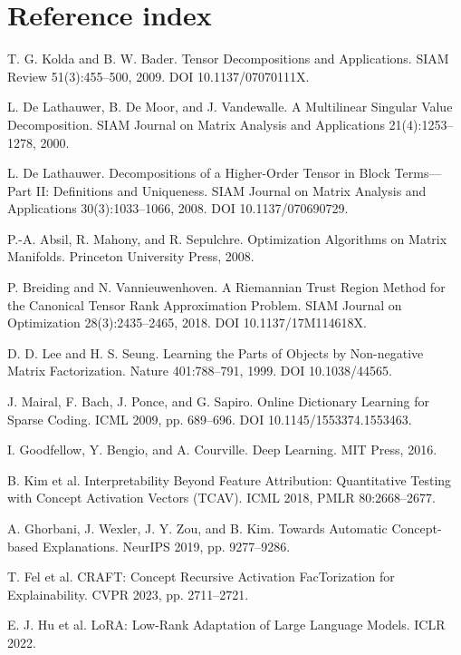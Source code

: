 \documentclass[10pt]{article}
\begin{document}
\section{Reference index}
\begin{description}[leftmargin=1.55cm,style=nextline,itemsep=.55em]
\item[\textbf{[KB09]}] T. G. Kolda and B. W. Bader. Tensor Decompositions and Applications. SIAM Review 51(3):455--500, 2009. DOI 10.1137/07070111X.
\item[\textbf{[DLV00]}] L. De Lathauwer, B. De Moor, and J. Vandewalle. A Multilinear Singular Value Decomposition. SIAM Journal on Matrix Analysis and Applications 21(4):1253--1278, 2000.
\item[\textbf{[DL08]}] L. De Lathauwer. Decompositions of a Higher-Order Tensor in Block Terms---Part II: Definitions and Uniqueness. SIAM Journal on Matrix Analysis and Applications 30(3):1033--1066, 2008. DOI 10.1137/070690729.
\item[\textbf{[AMS08]}] P.-A. Absil, R. Mahony, and R. Sepulchre. Optimization Algorithms on Matrix Manifolds. Princeton University Press, 2008.
\item[\textbf{[BV18]}] P. Breiding and N. Vannieuwenhoven. A Riemannian Trust Region Method for the Canonical Tensor Rank Approximation Problem. SIAM Journal on Optimization 28(3):2435--2465, 2018. DOI 10.1137/17M114618X.
\item[\textbf{[LS99]}] D. D. Lee and H. S. Seung. Learning the Parts of Objects by Non-negative Matrix Factorization. Nature 401:788--791, 1999. DOI 10.1038/44565.
\item[\textbf{[MBPS09]}] J. Mairal, F. Bach, J. Ponce, and G. Sapiro. Online Dictionary Learning for Sparse Coding. ICML 2009, pp. 689--696. DOI 10.1145/1553374.1553463.
\item[\textbf{[GBC16]}] I. Goodfellow, Y. Bengio, and A. Courville. Deep Learning. MIT Press, 2016.
\item[\textbf{[KIM18]}] B. Kim et al. Interpretability Beyond Feature Attribution: Quantitative Testing with Concept Activation Vectors (TCAV). ICML 2018, PMLR 80:2668--2677.
\item[\textbf{[GHO19]}] A. Ghorbani, J. Wexler, J. Y. Zou, and B. Kim. Towards Automatic Concept-based Explanations. NeurIPS 2019, pp. 9277--9286.
\item[\textbf{[FEL23]}] T. Fel et al. CRAFT: Concept Recursive Activation FacTorization for Explainability. CVPR 2023, pp. 2711--2721.
\item[\textbf{[HUE22]}] E. J. Hu et al. LoRA: Low-Rank Adaptation of Large Language Models. ICLR 2022.

\end{description}
\end{document}
